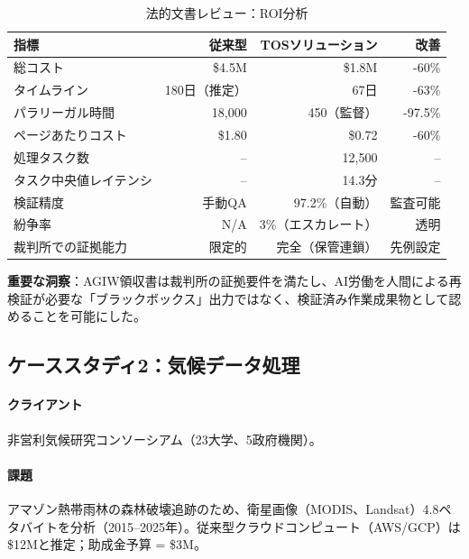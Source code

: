 \documentclass[11pt]{article}
\begin{document}
\begin{table}[H]
\centering
\caption{法的文書レビュー：ROI分析}
\label{tab:legal-roi}
\begin{tabular}{@{}lrrr@{}}
\toprule
\textbf{指標} & \textbf{従来型} & \textbf{TOSソリューション} & \textbf{改善} \\ \midrule
総コスト & \$4.5M & \$1.8M & -60\% \\
タイムライン & 180日（推定） & 67日 & -63\% \\
パラリーガル時間 & 18,000 & 450（監督） & -97.5\% \\
ページあたりコスト & \$1.80 & \$0.72 & -60\% \\
処理タスク数 & -- & 12,500 & -- \\
タスク中央値レイテンシ & -- & 14.3分 & -- \\
検証精度 & 手動QA & 97.2\%（自動） & 監査可能 \\
紛争率 & N/A & 3\%（エスカレート） & 透明 \\
裁判所での証拠能力 & 限定的 & 完全（保管連鎖） & 先例設定 \\
\bottomrule
\end{tabular}
\end{table}

\textbf{重要な洞察}：AGIW領収書は裁判所の証拠要件を満たし、AI労働を人間による再検証が必要な「ブラックボックス」出力ではなく、検証済み作業成果物として認めることを可能にした。

\subsection{ケーススタディ2：気候データ処理}

\paragraph{クライアント} 非営利気候研究コンソーシアム（23大学、5政府機関）。

\paragraph{課題} アマゾン熱帯雨林の森林破壊追跡のため、衛星画像（MODIS、Landsat）4.8ペタバイトを分析（2015--2025年）。従来型クラウドコンピュート（AWS/GCP）は\$12Mと推定；助成金予算 = \$3M。
\end{document}
